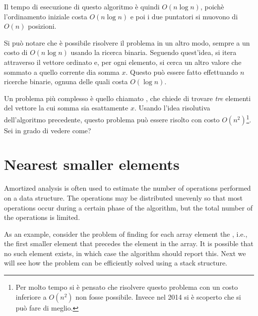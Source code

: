 \begin{center}
\end{center}

Il tempo di esecuzione di questo algoritmo è quindi
$O(n \log n)$, poichè l'ordinamento iniziale costa $O(n \log n)$ e
poi i due puntatori si muovono di $O(n)$ posizioni.

Si può notare che è possibile risolvere il problema in un altro
modo, sempre a un costo di $O(n \log n)$ usando la ricerca binaria.
Seguendo quest'idea, si itera attraverso il vettore ordinato e, per ogni elemento, si cerca
un altro valore che sommato a quello corrente dia somma $x$.
Questo può essere fatto effettuando $n$ ricerche binarie,
ognuna delle quali costa $O(\log n)$.

Un problema più complesso è quello chiamato
, che chiede di trovare \emph{tre} elementi del vettore la 
cui somma sia esattamente $x$.
Usando l'idea risolutiva dell'algoritmo precedente,
questo problema può essere risolto con costo $O(n^2)$\footnote{
Per molto tempo si è pensato che risolvere questo problema
con un costo inferiore a $O(n^2)$ non fosse possibile.
Invece nel 2014 si è scoperto \cite{gro14}
che si può fare di meglio.}. Sei in grado di vedere come?

\section{Nearest smaller elements}


Amortized analysis is often used to
estimate the number of operations
performed on a data structure.
The operations may be distributed unevenly so
that most operations occur during a
certain phase of the algorithm, but the total
number of the operations is limited.

As an example, consider the problem
of finding for each array element
the , i.e.,
the first smaller element that precedes the element
in the array.
It is possible that no such element exists,
in which case the algorithm should report this.
Next we will see how the problem can be
efficiently solved using a stack structure.

